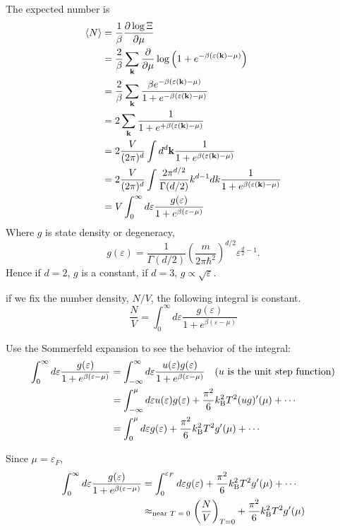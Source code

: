 \documentclass[a4paper,11pt]{article}
\begin{document}
The expected number is
\begin{align}
    \braket{N}
    &=\frac{1}{\beta}\frac{\partial\log\Xi}{\partial \mu}\\
    &=\frac{2}{\beta}\sum_{\mathbf k}\frac{\partial}{\partial \mu}\log\left(1+e^{-\beta(\varepsilon(\mathbf k)-\mu)}\right)\\
    &=\frac{2}{\beta}\sum_{\mathbf k}\frac{\beta e^{-\beta(\varepsilon(\mathbf k)-\mu)}}{1+e^{-\beta(\varepsilon(\mathbf k)-\mu)}}\\
    &=2\sum_{\mathbf k}\frac{1}{1+e^{+\beta(\varepsilon(\mathbf k)-\mu)}}\\
    &=2\frac{V}{(2\pi)^d}\int d^d\mathbf k\frac{1}{1+e^{\beta(\varepsilon(\mathbf k)-\mu)}}\\
    &=2\frac{V}{(2\pi)^d}\int \frac{2\pi^{d/2}}{\Gamma(d/2)}k^{d-1} dk\frac{1}{1+e^{\beta(\varepsilon(\mathbf k)-\mu)}}\\
    &=V\int_0^\infty d\varepsilon \frac{g(\varepsilon)}{1 + e^{\beta(\varepsilon - \mu)}}
\end{align}
Where $g$ is state density or degeneracy, 
\begin{equation}
    g(\varepsilon) = \frac{1}{\Gamma(d/2)}\left(\frac{m}{2\pi\hbar^2}\right)^{d/2}\varepsilon^{\frac{d}{2}-1}.
\end{equation}
Hence if $d=2$, $g$ is a constant, if $d=3$, $g\propto\sqrt{\varepsilon}$.

if we fix the number density, $N/V$, the following integral is constant.
\begin{equation}
    \frac{N}{V} = \int_{0}^\infty d\varepsilon \frac{g(\varepsilon)}{1+e^{\beta(\varepsilon-\mu)}}
\end{equation}

Use the Sommerfeld expansion to see the behavior of the integral:
\begin{align}
    \int_{0}^\infty d\varepsilon \frac{g(\varepsilon)}{1+e^{\beta(\varepsilon-\mu)}}
    &= \int_{-\infty}^\infty d\varepsilon \frac{u(\varepsilon)g(\varepsilon)}{1+e^{\beta(\varepsilon-\mu)}} \quad (\text{$u$ is the unit step function})\\
    &=\int_{-\infty}^\mu d\varepsilon u(\varepsilon)g(\varepsilon) + \frac{\pi^2}{6}k_{\mathrm{B}}^2T^2(ug)'(\mu) +\cdots \\
    &=\int_{0}^\mu d\varepsilon g(\varepsilon) + \frac{\pi^2}{6}k_{\mathrm{B}}^2T^2g'(\mu) +\cdots \\
\end{align}

Since $\mu=\varepsilon_F$, 
\begin{align}
    \int_{0}^\infty d\varepsilon \frac{g(\varepsilon)}{1+e^{\beta(\varepsilon-\mu)}}
    &=\int_{0}^{\varepsilon_F} d\varepsilon g(\varepsilon) + \frac{\pi^2}{6}k_{\mathrm{B}}^2T^2g'(\mu) +\cdots \\
    &\approx_{\text{near $T=0$}} \left(\frac{N}{V}\right)_{T=0} + \frac{\pi^2}{6}k_{\mathrm{B}}^2T^2g'(\mu)
\end{align}
\end{document}
